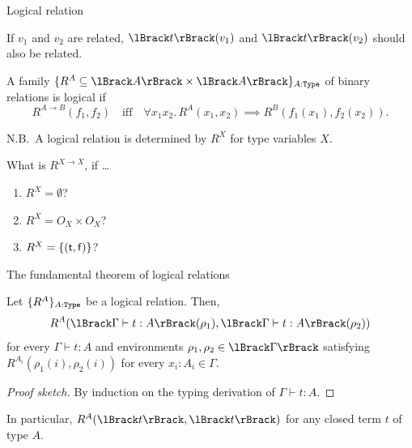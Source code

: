 \begin{frame}{Logical relation}
  \begin{idea}
    If $v_1$ and $v_2$ are related, $\Brackets{t}(v_1)$ and $\Brackets{t}(v_2)$ should also be related.
  \end{idea}
  A family $\{R^A \subseteq \Brackets{A} \times \Brackets{A} \}_{A : \type}$ of binary relations is \alert{logical} if 
  \[
    R^{A \to B}(f_1, f_2) \quad\text{iff}\quad \forall x_1 x_2.\, R^{A}(x_1, x_2) \implies R^{B}(f_1(x_1), f_2(x_2)).
  \]

  N.B.\ A logical relation is determined by $R^X$ for type variables $X$.
  \begin{exercise*}
    What is $R^{X \to X}$, if \dots
    \begin{enumerate}
      \item $R^X = \emptyset$?
      \item $R^X = O_X \times O_X$?
      \item $R^X = \{(\mathsf{t}, \mathsf{f})\}$?
    \end{enumerate}
  \end{exercise*}
\end{frame}

\begin{frame}{The fundamental theorem of logical relations}
  \begin{theorem}\label{thm:fundamental_thm}
    Let $\{R^A\}_{A : \mathtt{Type}}$ be a logical relation.
    Then, 
    \[
      R^A(\Brackets{\Gamma \vdash t : A}(\rho_1), \Brackets{\Gamma \vdash t : A}(\rho_2))
    \]
    for every $\Gamma \vdash t : A$ and environments $\rho_1, \rho_2 \in \Brackets{\Gamma}$ satisfying $R^{A_i}(\rho_1(i), \rho_2(i))$ for every $x_i : A_i \in \Gamma$.
  \end{theorem}
  \begin{proof}[Proof sketch]
    By induction on the typing derivation of $\Gamma \vdash t : A$.
%
  \end{proof}
  In particular, $R^A(\Brackets{t}, \Brackets{t})$ for any closed term $t$ of type $A$. 
\end{frame}

